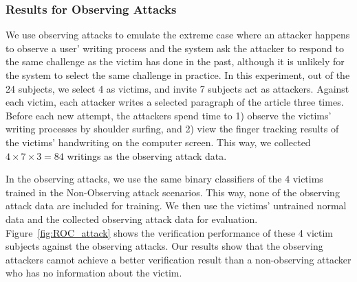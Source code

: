 %

\subsubsection{Results for Observing Attacks}


We use observing attacks to emulate the extreme case where an attacker happens to observe a user' writing process and the system ask the attacker to respond to the same challenge as the victim has done in the past, although it is unlikely for the system to select the same challenge in practice.  In this experiment, out of the 24 subjects, we  select 4 as victims, and invite 7 subjects act as attackers. Against each victim, each attacker writes a selected paragraph of the article three times. Before each new attempt, the attackers spend time to 1) observe the victims' writing processes by shoulder surfing, 
and 2) view the finger tracking results of the victims' handwriting on the computer screen. This way, we collected $4\times 7 \times 3=84$ writings as the observing attack data. 

In the observing attacks, we use the same binary classifiers of the 4 victims trained in the Non-Observing attack scenarios. This way, none of the observing attack data are included for training. We then use the victims' untrained normal data and the collected observing attack data for evaluation. Figure~\ref{fig:ROC_attack} shows the verification performance of these 4 victim subjects against the observing attacks. Our results show that the observing attackers cannot achieve a better verification result than a non-observing attacker who has no information about the victim.  



